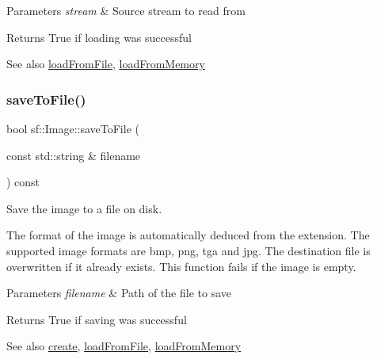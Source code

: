 \begin{DoxyParams}{Parameters}
{\em stream} & Source stream to read from\\
\hline
\end{DoxyParams}
\begin{DoxyReturn}{Returns}
True if loading was successful
\end{DoxyReturn}
\begin{DoxySeeAlso}{See also}
\mbox{\hyperlink{classsf_1_1_image_a9e4f2aa8e36d0cabde5ed5a4ef80290b}{load\+From\+File}}, \mbox{\hyperlink{classsf_1_1_image_aaa6c7afa5851a51cec6ab438faa7354c}{load\+From\+Memory}} \begin{DoxyVerb}\end{DoxyVerb}
 
\end{DoxySeeAlso}
\mbox{\label{classsf_1_1_image_a51537fb667f47cbe80395cfd7f9e72a4}} 
\subsubsection{\texorpdfstring{saveToFile()}{saveToFile()}}
{\footnotesize\ttfamily bool sf\+::\+Image\+::save\+To\+File (\begin{DoxyParamCaption}\item[{const std\+::string \&}]{filename }\end{DoxyParamCaption}) const}



Save the image to a file on disk. 

The format of the image is automatically deduced from the extension. The supported image formats are bmp, png, tga and jpg. The destination file is overwritten if it already exists. This function fails if the image is empty.


\begin{DoxyParams}{Parameters}
{\em filename} & Path of the file to save\\
\hline
\end{DoxyParams}
\begin{DoxyReturn}{Returns}
True if saving was successful
\end{DoxyReturn}
\begin{DoxySeeAlso}{See also}
\mbox{\hyperlink{classsf_1_1_image_a2a67930e2fd9ad97cf004e918cf5832b}{create}}, \mbox{\hyperlink{classsf_1_1_image_a9e4f2aa8e36d0cabde5ed5a4ef80290b}{load\+From\+File}}, \mbox{\hyperlink{classsf_1_1_image_aaa6c7afa5851a51cec6ab438faa7354c}{load\+From\+Memory}} \begin{DoxyVerb}\end{DoxyVerb}
 
\end{DoxySeeAlso}
\mbox{\label{classsf_1_1_image_a9fd329b8cd7d4439e07fb5d3bb2d9744}} 
